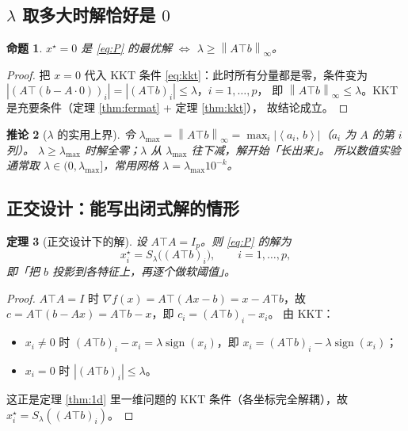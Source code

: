\documentclass[11pt,a4paper,UTF8]{ctexart}
\theoremstyle{plain}
\newtheorem{theorem}{定理}[section]
\newtheorem{proposition}[theorem]{命题}
\newtheorem{corollary}[theorem]{推论}
\theoremstyle{definition}
\theoremstyle{remark}
\newcommand{\norm}[1]{\left\lVert #1 \right\rVert}
\newcommand{\abs}[1]{\left\lvert #1 \right\rvert}
\newcommand{\inner}[2]{\left\langle #1,\, #2 \right\rangle}
\DeclareMathOperator{\sign}{sign}
\begin{document}
\subsection{$\lambda$ 取多大时解恰好是 $0$}

\begin{proposition}\label{prop:lambda0}
$x^\star=0$ 是 \eqref{eq:P} 的最优解 $\iff$ $\lambda\ge\norm{A\top b}_\infty$。
\end{proposition}

\begin{proof}
把 $x=0$ 代入 KKT 条件 \eqref{eq:kkt}：此时所有分量都是零，条件变为
$\abs{(A\top(b-A\cdot0))_i}=\abs{(A\top b)_i}\le\lambda$，$i=1,\dots,p$，
即 $\norm{A\top b}_\infty\le\lambda$。KKT 是充要条件（定理 \ref{thm:fermat} + 定理 \ref{thm:kkt}），
故结论成立。
\end{proof}

\begin{corollary}[$\lambda$ 的实用上界]
令 $\lambda_{\max}=\norm{A\top b}_\infty=\max_i\abs{\inner{a_i}{b}}$（$a_i$ 为 $A$ 的第 $i$ 列）。
$\lambda\ge\lambda_{\max}$ 时解全零；$\lambda$ 从 $\lambda_{\max}$ 往下减，解开始「长出来」。
所以数值实验通常取 $\lambda\in(0,\lambda_{\max}]$，常用网格 $\lambda=\lambda_{\max}10^{-k}$。
\end{corollary}

\subsection{正交设计：能写出闭式解的情形}

\begin{theorem}[正交设计下的解]\label{thm:orth}
设 $A\top A=I_p$。则 \eqref{eq:P} 的解为
\[
x_i^\star=S_\lambda\bigl((A\top b)_i\bigr),\qquad i=1,\dots,p,
\]
即「把 $b$ 投影到各特征上，再逐个做软阈值」。
\end{theorem}

\begin{proof}
$A\top A=I$ 时 $\nabla f(x)=A\top(Ax-b)=x-A\top b$，故 $c=A\top(b-Ax)=A\top b-x$，即 $c_i=(A\top b)_i-x_i$。
由 KKT：
\begin{itemize}
\item $x_i\neq0$ 时 $(A\top b)_i-x_i=\lambda\sign(x_i)$，即 $x_i=(A\top b)_i-\lambda\sign(x_i)$；
\item $x_i=0$ 时 $\abs{(A\top b)_i}\le\lambda$。
\end{itemize}
这正是定理 \ref{thm:1d} 里一维问题的 KKT 条件（各坐标完全解耦），故 $x_i^\star=S_\lambda((A\top b)_i)$。
\end{proof}
\end{document}
